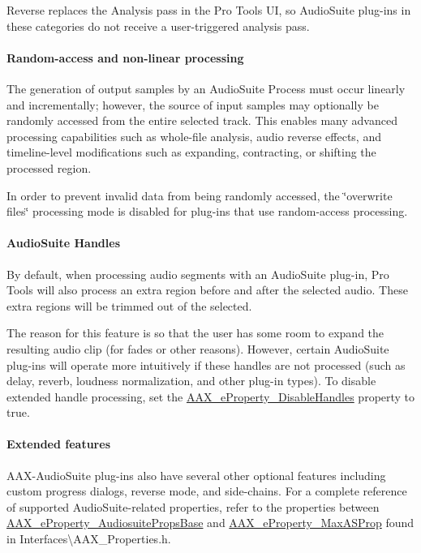 Reverse replaces the Analysis pass in the Pro Tools U\+I, so Audio\+Suite plug-\/ins in these categories do not receive a user-\/triggered analysis pass.

\hypertarget{a00360_subsubsection__random-access_and_non-linear_processing_}{}\paragraph{Random-\/access and non-\/linear processing}\label{a00360_subsubsection__random-access_and_non-linear_processing_}
 The generation of output samples by an Audio\+Suite Process must occur linearly and incrementally; however, the source of input samples may optionally be randomly accessed from the entire selected track. This enables many advanced processing capabilities such as whole-\/file analysis, audio reverse effects, and timeline-\/level modifications such as expanding, contracting, or shifting the processed region.

In order to prevent invalid data from being randomly accessed, the \char`\"{}overwrite files\char`\"{} processing mode is disabled for plug-\/ins that use random-\/access processing.

\hypertarget{a00360_subsubsection__audiosuite_handles_}{}\paragraph{Audio\+Suite Handles}\label{a00360_subsubsection__audiosuite_handles_}
 By default, when processing audio segments with an Audio\+Suite plug-\/in, Pro Tools will also process an extra region before and after the selected audio. These extra regions will be trimmed out of the selected.



The reason for this feature is so that the user has some room to expand the resulting audio clip (for fades or other reasons). However, certain Audio\+Suite plug-\/ins will operate more intuitively if these handles are not processed (such as delay, reverb, loudness normalization, and other plug-\/in types). To disable extended handle processing, set the \hyperlink{a00283_a6571f4e41a5dd06e4067249228e2249ea943c37cd8a41a4d271dd28c89b518044}{A\+A\+X\+\_\+e\+Property\+\_\+\+Disable\+Handles} property to true.



\hypertarget{a00360_subsubsection_extended_features}{}\paragraph{Extended features}\label{a00360_subsubsection_extended_features}
 A\+A\+X-\/\+Audio\+Suite plug-\/ins also have several other optional features including custom progress dialogs, reverse mode, and side-\/chains. For a complete reference of supported Audio\+Suite-\/related properties, refer to the properties between \hyperlink{a00283_a6571f4e41a5dd06e4067249228e2249eae774ad8d49f9d021fc39e7d9c6f08070}{A\+A\+X\+\_\+e\+Property\+\_\+\+Audiosuite\+Props\+Base} and \hyperlink{a00283_a6571f4e41a5dd06e4067249228e2249eac1731b45ed9daa8380c224c9d2b4050a}{A\+A\+X\+\_\+e\+Property\+\_\+\+Max\+A\+S\+Prop} found in Interfaces\textbackslash{}\+A\+A\+X\+\_\+\+Properties.\+h.



